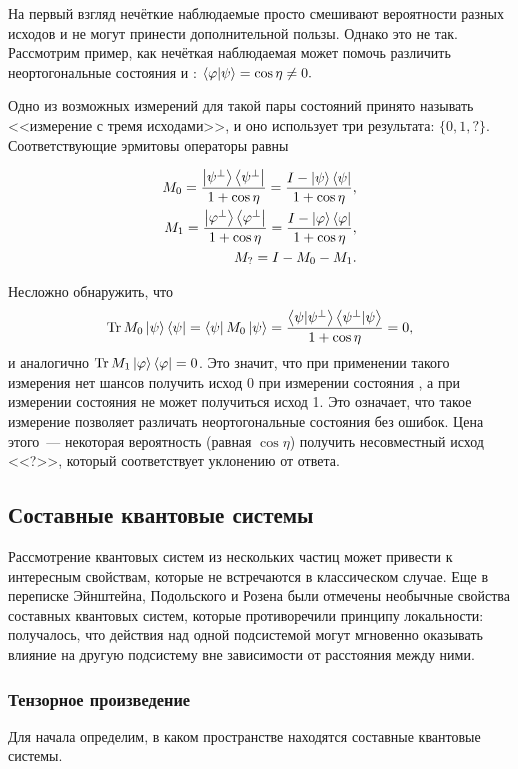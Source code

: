 На первый взгляд нечёткие наблюдаемые просто смешивают вероятности разных исходов и не могут принести дополнительной пользы. Однако это не так.
Рассмотрим пример, как нечёткая наблюдаемая может помочь различить неортогональные состояния \state{\varphi} и \state{\psi}: $ \left\langle \varphi|\psi\right\rangle = \cos \eta \neq 0.$

Одно из возможных измерений для такой пары состояний принято называть <<измерение с тремя исходами>>, и оно использует три результата: $\{0, 1, ?\}$. Соответствующие эрмитовы операторы равны

\begin{eqnarray}\label{unambigious_measurement}
  M_0 = \frac{\left| \psi^\bot \right\rangle\left\langle \psi^\bot \right|}{1 + \cos \eta} = \frac{I - \left| \psi \right\rangle\left\langle \psi \right|}{1 + \cos \eta}, \nonumber\\
  M_1 = \frac{\left| \varphi^\bot \right\rangle\left\langle \varphi^\bot \right|}{1 + \cos \eta} = \frac{I - \left| \varphi \right\rangle\left\langle \varphi \right|}{1 + \cos \eta}, \\
  M_? = I - M_0 - M_1. \nonumber
\end{eqnarray}

Несложно обнаружить, что 
$$ \operatorname{Tr} M_0 \left| \psi \right\rangle\left\langle \psi \right| = \left\langle \psi \right| M_0 \left| \psi \right\rangle = \frac{\left\langle \psi|\psi^\bot\right\rangle \left\langle \psi^\bot|\psi\right\rangle}{1 + \cos \eta} = 0, $$
и аналогично $\operatorname{Tr} M_1 \left| \varphi \right\rangle\left\langle \varphi \right| = 0$. Это значит, что при применении такого измерения нет шансов получить исход 0 при измерении состояния \state{\psi}, а при измерении состояния \state{\varphi} не может получиться исход 1. Это означает, что такое измерение позволяет различать неортогональные состояния без ошибок. Цена этого~--- некоторая вероятность (равная $\cos \eta$) получить несовместный исход <<?>>, который соответствует уклонению от ответа.

\subsection{Составные квантовые системы}
Рассмотрение квантовых систем из нескольких частиц может привести к интересным свойствам, которые не встречаются в классическом случае. Еще в переписке Эйнштейна, Подольского и Розена \cite{epr_paradox} были отмечены необычные свойства составных квантовых систем, которые противоречили принципу локальности: получалось, что действия над одной подсистемой могут мгновенно оказывать влияние на другую подсистему вне зависимости от расстояния между ними. 
\subsubsection{Тензорное произведение}
Для начала определим, в каком пространстве находятся составные квантовые системы.

